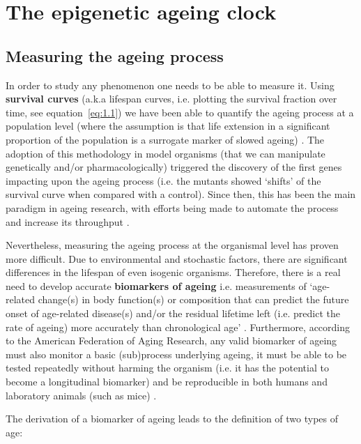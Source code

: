 \bigskip

\section{The epigenetic ageing clock}

\subsection{Measuring the ageing process}

\smallskip

In order to study any phenomenon one needs to be able to measure it. Using \textbf{survival curves} (a.k.a lifespan curves, i.e. plotting the survival fraction over time, see equation~\ref{eq:1.1}) we have been able to quantify the ageing process at a population level (where the assumption is that life extension in a significant proportion of the population is a surrogate marker of slowed ageing) \citep{Johnson2013}. The adoption of this methodology in model organisms (that we can manipulate genetically and/or pharmacologically) triggered the discovery of the first genes impacting upon the ageing process (i.e. the mutants showed `shifts' of the survival curve when compared with a control). Since then, this has been the main paradigm in ageing research, with efforts being made to automate the process and increase its throughput \citep{Stroustrup2013}.

\bigskip

Nevertheless, measuring the ageing process at the organismal level has proven more difficult. Due to environmental and stochastic factors, there are significant differences in the lifespan of even isogenic organisms. Therefore, there is a real need to develop accurate \textbf{biomarkers of ageing} i.e. measurements of `age-related change(s) in body function(s) or composition that can predict the future onset of age-related disease(s) and/or the residual lifetime left (i.e. predict the rate of ageing) more accurately than chronological age' \citep{Burkle2015a}. Furthermore, according to the American Federation of Aging Research, any valid biomarker of ageing must also monitor a basic (sub)process underlying ageing, it must be able to be tested repeatedly without harming the organism (i.e. it has the potential to become a longitudinal biomarker) and be reproducible in both humans and laboratory animals (such as mice) \citep{Burkle2015a}.

\bigskip

The derivation of a biomarker of ageing leads to the definition of two types of age:

